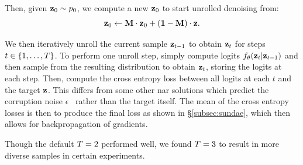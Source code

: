 Then, given $\mathbf{z}_0 \sim p_0$, we compute a new $\mathbf{z}_0$ to start unrolled
denoising from:
\begin{equation}
    \mathbf{z}_0 \leftarrow \mathbf{M} \cdot \mathbf{z}_0 + (\mathbf{1} - \mathbf{M})
    \cdot \mathbf{z} \text{.}
\end{equation}

We then iteratively unroll the current sample $\mathbf{z}_{t-1}$ to obtain
$\mathbf{z}_t$ for steps $t\in \{1, \dots, T\}$. To perform one unroll
step, simply compute logits $f_\theta(\mathbf{z}_t \vert \mathbf{z}_{t-1})$ and then
sample from the resulting distribution to obtain $\mathbf{z}_t$, storing the logits
at each step. Then, compute the cross entropy loss between all logits at each
$t$ and the target $\mathbf{z}$. This differs from some other \gls{nar} solutions
which predict the corruption noise $\epsilon$~\cite{ho2020ddpm} rather than the
target itself. The mean of the cross entropy losses is then to produce the final
loss as shown in \S\ref{subsec:sundae}, which then allows for backpropagation
of gradients.

Though the default $T = 2$ performed well, we found $T =
3$ to result in more diverse samples in certain experiments.

